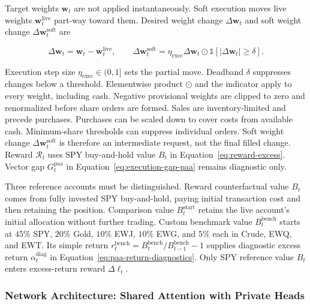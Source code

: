 Target weights \(\mathbf w_t\) are not applied instantaneously. Soft execution moves live weights \(\mathbf w_t^{\mathrm{live}}\) part-way toward them. Desired weight change \(\Delta\mathbf w_t\) and soft weight change \(\Delta\mathbf w_t^{\mathrm{soft}}\) are

\begin{equation}
\Delta\mathbf w_t=\mathbf w_t-\mathbf w_t^{\mathrm{live}},\qquad
\Delta\mathbf w_t^{\mathrm{soft}}=
\eta_{\mathrm{exec}}\Delta\mathbf w_t\odot
\mathbb{1}[|\Delta\mathbf w_t|\geq\delta].
\label{eq:paa-soft-execution}
\end{equation}

Execution step size \(\eta_{\mathrm{exec}}\in(0,1]\) sets the partial move. Deadband \(\delta\) suppresses changes below a threshold. Elementwise product \(\odot\) and the indicator apply to every weight, including cash. Negative provisional weights are clipped to zero and renormalized before share orders are formed. Sales are inventory-limited and precede purchases. Purchases can be scaled down to cover costs from available cash. Minimum-share thresholds can suppress individual orders. Soft weight change \(\Delta\mathbf w_t^{\mathrm{soft}}\) is therefore an intermediate request, not the final filled change. Reward \(\mathcal R_t\) uses SPY buy-and-hold value \(B_t\) in Equation~\eqref{eq:reward-excess}. Vector gap \(G_t^{\mathrm{paa}}\) in Equation~\eqref{eq:execution-gap-paa} remains diagnostic only.

Three reference accounts must be distinguished. Reward counterfactual value \(B_t\) comes from fully invested SPY buy-and-hold, paying initial transaction cost and then retaining the position. Comparison value \(B_t^{\mathrm{start}}\) retains the live account's initial allocation without further trading. Custom benchmark value \(B_t^{\mathrm{bench}}\) starts at \(45\%\) SPY, \(20\%\) Gold, \(10\%\) EWJ, \(10\%\) EWG, and \(5\%\) each in Crude, EWQ, and EWT. Its simple return \(r_t^{\mathrm{bench}}=B_t^{\mathrm{bench}}/B_{t-1}^{\mathrm{bench}}-1\) supplies diagnostic excess return \(\alpha_t^{\mathrm{diag}}\) in Equation~\eqref{eq:paa-return-diagnostics}. Only SPY reference value \(B_t\) enters excess-return reward \(\Delta\ell_t\).

\subsubsection{Network Architecture: Shared Attention with Private Heads}
\label{sec:paa-network}


